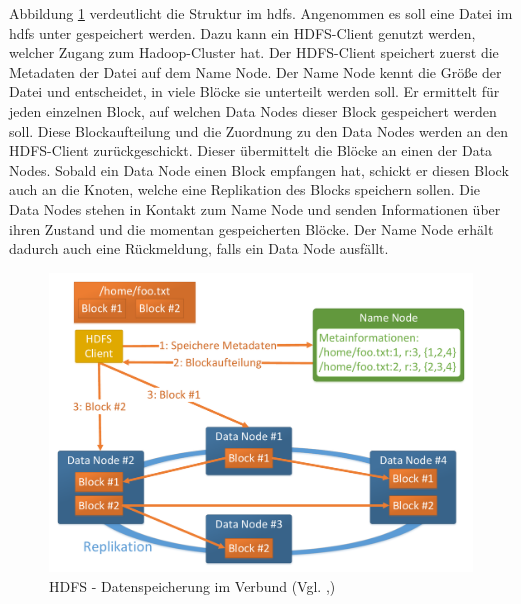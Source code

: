 \noindent
Abbildung \ref{fig:hdfs_cluster_architecture} verdeutlicht die Struktur im \gls{hdfs}. Angenommen es soll eine Datei im \gls{hdfs} unter  gespeichert werden. Dazu kann ein HDFS-Client genutzt werden, welcher Zugang zum Hadoop-Cluster hat. Der HDFS-Client speichert zuerst die Metadaten der Datei auf dem Name Node. Der Name Node kennt die Größe der Datei und entscheidet, in viele Blöcke sie unterteilt werden soll. Er ermittelt für jeden einzelnen Block, auf welchen Data Nodes dieser Block gespeichert werden soll. Diese Blockaufteilung und die Zuordnung zu den Data Nodes werden an den HDFS-Client zurückgeschickt. Dieser übermittelt die Blöcke an einen der Data Nodes. Sobald ein Data Node einen Block empfangen hat, schickt er diesen Block auch an die Knoten, welche eine Replikation des Blocks speichern sollen. Die Data Nodes stehen in Kontakt zum Name Node und senden Informationen über ihren Zustand und die momentan gespeicherten Blöcke. Der Name Node erhält dadurch auch eine Rückmeldung, falls ein Data Node ausfällt.

\begin{figure}[ht]
  \centering
  \includegraphics[width=\textwidth]{./resource/hdfs_cluster_architecture.pdf}
  \caption{HDFS - Datenspeicherung im Verbund (Vgl. \cite{hdfs_architecture},\cite{expert_hadoop_admin})}
  \label{fig:hdfs_cluster_architecture}
\end{figure}

